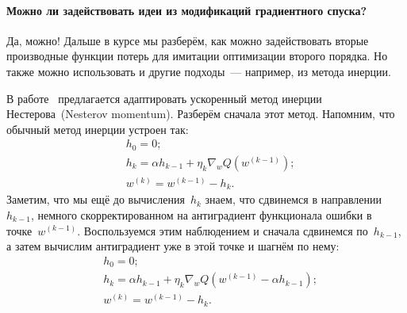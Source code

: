 \documentclass[12pt,fleqn]{article}
\begin{document}
\paragraph{Можно ли задействовать идеи из модификаций градиентного спуска?}
Да, можно!
Дальше в курсе мы разберём, как можно задействовать вторые производные
функции потерь для имитации оптимизации второго порядка.
Но также можно использовать и другие подходы~--- например, из метода инерции.

В работе~\cite{lu20accelerating} предлагается адаптировать ускоренный метод инерции Нестерова~(Nesterov momentum).
Разберём сначала этот метод.
Напомним, что обычный метод инерции устроен так:
\begin{align*}
    &h_0 = 0;\\
    &h_k = \alpha h_{k - 1} + \eta_k \nabla_w Q(w^{(k-1)});\\
    &w^{(k)} = w^{(k-1)} - h_k.
\end{align*}
Заметим, что мы ещё до вычисления~$h_k$ знаем, что сдвинемся в направлении~$h_{k - 1}$,
немного скорректированном на антиградиент функционала ошибки в точке~$w^{(k-1)}$.
Воспользуемся этим наблюдением и сначала сдвинемся по~$h_{k - 1}$,
а затем вычислим антиградиент уже в этой точке и шагнём по нему:
\begin{align*}
    &h_0 = 0;\\
    &h_k = \alpha h_{k - 1} + \eta_k \nabla_w Q(w^{(k-1)} - \alpha h_{k - 1});\\
    &w^{(k)} = w^{(k-1)} - h_k.
\end{align*}
\end{document}
